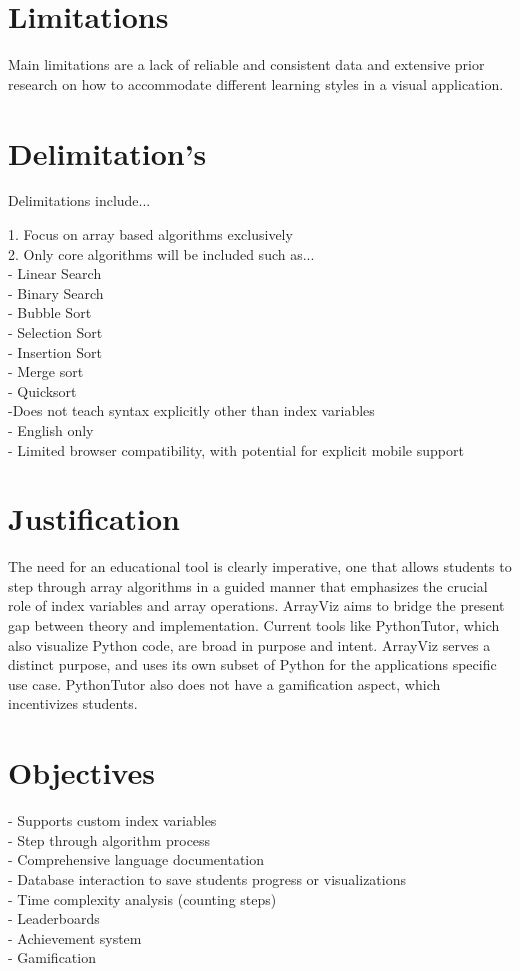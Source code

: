 \documentclass{article}
\begin{document}
\section{Limitations}
Main limitations are a lack of reliable and consistent data and extensive prior research on how to accommodate different learning styles in a visual application.
\section{Delimitation's}
Delimitations include...

1. Focus on array based algorithms exclusively\\
2. Only core algorithms will be included such as...\\
- Linear Search\\
- Binary Search\\
- Bubble Sort\\
- Selection Sort\\
- Insertion Sort\\
- Merge sort\\
- Quicksort\\
-Does not teach syntax explicitly other than index variables\\
- English only\\
- Limited browser compatibility, with potential for explicit mobile support\\  
\section{Justification}
The need for an educational tool is clearly imperative, one that allows students to step through array algorithms in a guided manner that emphasizes the crucial role of index variables and array operations. ArrayViz aims to bridge the present gap between theory and implementation. Current tools like PythonTutor, which also visualize Python code, are broad in purpose and intent. ArrayViz serves a distinct purpose, and uses its own subset of Python for the applications specific use case. PythonTutor also does not have a gamification aspect, which incentivizes students. 
\section{Objectives}
- Supports custom index variables\\
- Step through algorithm process\\
- Comprehensive language documentation\\
- Database interaction to save students progress or visualizations \\
- Time complexity analysis (counting steps) \\
- Leaderboards \\
- Achievement system \\ 
- Gamification \\
\end{document}
